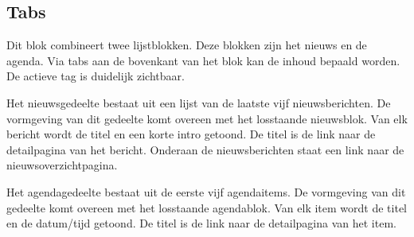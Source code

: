 \subsection{Tabs}
\label{sec:tabs}
Dit blok combineert twee lijstblokken. Deze blokken zijn het nieuws en de agenda. Via tabs aan de bovenkant van het blok kan de inhoud bepaald worden. De actieve tag is duidelijk zichtbaar.

Het nieuwsgedeelte bestaat uit een lijst van de laatste vijf nieuwsberichten. De vormgeving van dit gedeelte komt overeen met het losstaande nieuwsblok. Van elk bericht wordt de titel en een korte intro getoond. De titel is de link naar de detailpagina van het bericht. Onderaan de nieuwsberichten staat een link naar de nieuwsoverzichtpagina. 

Het agendagedeelte  bestaat uit de eerste vijf agendaitems. De vormgeving van dit gedeelte komt overeen met het losstaande agendablok. Van elk item wordt de titel en de datum/tijd getoond. De titel is de link naar de detailpagina van het item.